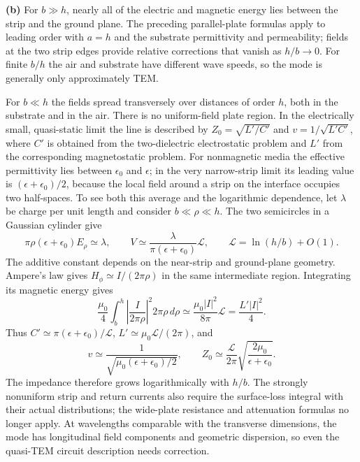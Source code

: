 \textbf{(b)} For $b\gg h$, nearly all of the electric and magnetic
energy lies between the strip and the ground plane.  The preceding
parallel-plate formulas apply to leading order with $a=h$ and the
substrate permittivity and permeability; fields at the two strip
edges provide relative corrections that vanish as $h/b\to0$.
For finite $b/h$ the air and substrate have different wave speeds,
so the mode is generally only approximately TEM.

For $b\ll h$ the fields spread transversely over distances of order
$h$, both in the substrate and in the air.  There is no uniform-field
plate region.  In the electrically small, quasi-static limit the
line is described by $Z_0=\sqrt{L'/C'}$ and
$v=1/\sqrt{L'C'}$, where $C'$ is obtained from the two-dielectric
electrostatic problem and $L'$ from the corresponding magnetostatic
problem.  For nonmagnetic media the effective permittivity lies
between $\epsilon_0$ and $\epsilon$; in the very narrow-strip limit
its leading value is $(\epsilon+\epsilon_0)/2$, because the local
field around a strip on the interface occupies two half-spaces.
To see both this average and the logarithmic dependence, let $\lambda$
be charge per unit length and consider $b\ll\rho\ll h$. The two
semicircles in a Gaussian cylinder give
\[
\pi\rho(\epsilon+\epsilon_0)E_\rho\simeq\lambda,
\qquad V\simeq\frac{\lambda}{\pi(\epsilon+\epsilon_0)}\mathcal L,
\qquad \mathcal L=\ln(h/b)+O(1).
\]
The additive constant depends on the near-strip and ground-plane
geometry. Ampere's law gives $H_\phi\simeq I/(2\pi\rho)$ in the
same intermediate region. Integrating its magnetic energy gives
\[
\frac{\mu_0}{4}\int_b^h\left|\frac{I}{2\pi\rho}\right|^2
2\pi\rho\,d\rho\simeq\frac{\mu_0|I|^2}{8\pi}\mathcal L
=\frac{L'|I|^2}{4}.
\]
Thus $C'\simeq\pi(\epsilon+\epsilon_0)/\mathcal L$,
$L'\simeq\mu_0\mathcal L/(2\pi)$, and
\[
v\simeq\frac1{\sqrt{\mu_0(\epsilon+\epsilon_0)/2}},\qquad
Z_0\simeq\frac{\mathcal L}{2\pi}
\sqrt{\frac{2\mu_0}{\epsilon+\epsilon_0}}.
\]
The impedance therefore grows logarithmically with $h/b$. The
strongly nonuniform strip and return currents also
require the surface-loss integral with their actual distributions;
the wide-plate resistance and attenuation formulas no longer apply.
At wavelengths comparable with the transverse dimensions, the
mode has longitudinal field components and geometric dispersion,
so even the quasi-TEM circuit description needs correction.

